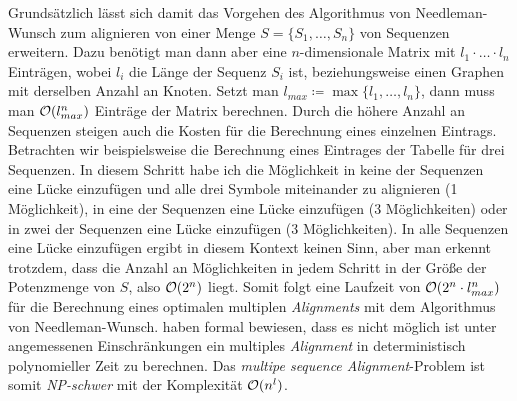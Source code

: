 \footnotesize
\begin{center}
\end{center}
\normalsize

Grundsätzlich lässt sich damit das Vorgehen des Algorithmus von Needleman-Wunsch zum alignieren von einer Menge $S = \{S_1,\dots,S_n\}$ von Sequenzen erweitern. Dazu benötigt man dann aber eine $n$-dimensionale Matrix mit $l_1\cdot \dots \cdot l_n$ Einträgen, wobei $l_i$ die Länge der Sequenz $S_i$ ist, beziehungsweise einen Graphen mit derselben Anzahl an Knoten. Setzt man $l_{max} \coloneqq \max\{l_1,\dots,l_n\}$, dann muss man $\mathcal{O}(l_{max}^n)$ Einträge der Matrix berechnen. Durch die höhere Anzahl an Sequenzen steigen auch die Kosten für die Berechnung eines einzelnen Eintrags. Betrachten wir beispielsweise die Berechnung eines Eintrages der Tabelle für drei Sequenzen. In diesem Schritt habe ich die Möglichkeit in keine der Sequenzen eine Lücke einzufügen und alle drei Symbole miteinander zu alignieren (1 Möglichkeit), in eine der Sequenzen eine Lücke einzufügen (3 Möglichkeiten) oder in zwei der Sequenzen eine Lücke einzufügen (3 Möglichkeiten). In alle Sequenzen eine Lücke einzufügen ergibt in diesem Kontext keinen Sinn, aber man erkennt trotzdem, dass die Anzahl an Möglichkeiten in jedem Schritt in der Größe der Potenzmenge von $S$, also $\mathcal{O}(2^n)$ liegt. Somit folgt eine Laufzeit von $\mathcal{O}(2^n\cdot l_{max}^n)$ für die Berechnung eines optimalen multiplen \emph{Alignments} mit dem Algorithmus von Needleman-Wunsch. \cite{wj94} haben formal bewiesen, dass es nicht möglich ist unter angemessenen Einschränkungen ein multiples \emph{Alignment} in deterministisch polynomieller Zeit zu berechnen. Das \emph{multipe sequence Alignment}-Problem ist somit \emph{NP-schwer} mit der Komplexität $\mathcal{O}(n^l)$.

